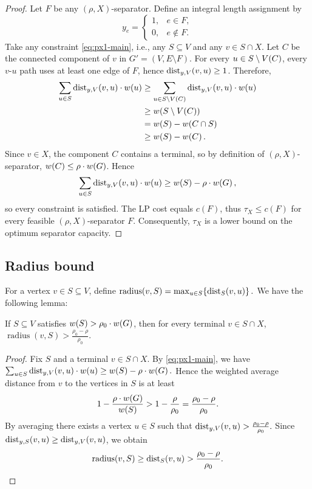 \begin{proof}
Let $F$ be any $(\rho,X)$-separator. Define an integral length assignment by
\[
    y_e=\begin{cases}
        1,& e\in F,\\
        0,& e\notin F.
    \end{cases}
\]
Take any constraint \eqref{eq:px1-main}, i.e., any $S\subseteq V$ and any $v\in S\cap X$.
Let $C$ be the connected component of $v$ in $G'=(V,E\setminus F)$.
For every $u\in S\setminus V\mathopen{}\left( C \right)$, every $v$-$u$ path uses at least one edge of $F$, hence $\text{dist}_{y,V}(v,u)\ge 1$.
Therefore,
\begin{align*}
\sum_{u\in S}\text{dist}_{y,V}(v,u)\cdot w(u)
&\ge \sum_{u\in S\setminus V\mathopen{}\left( C \right)}\text{dist}_{y,V}(v,u)\cdot w(u)\\
&\ge w\mathopen{}\left( S\setminus V\mathopen{}\left( C \right) \right)\\
&= w\mathopen{}\left( S \right)-w\mathopen{}\left( C\cap S \right)\\
&\ge w\mathopen{}\left( S \right)-w\mathopen{}\left( C \right).
\end{align*}
Since $v\in X$, the component $C$ contains a terminal, so by definition of $(\rho,X)$-separator,
$w(C)\le \rho\cdot w\mathopen{}\left( G \right)$. Hence
\[
\sum_{u\in S}\text{dist}_{y,V}(v,u)\cdot w(u)\ge w\mathopen{}\left( S \right)-\rho\cdot w\mathopen{}\left( G \right),
\]
so every constraint is satisfied. The LP cost equals $c(F)$, thus
$\tau_X\le c(F)$ for every feasible $(\rho,X)$-separator $F$. Consequently,
$\tau_X$ is a lower bound on the optimum separator capacity.
\end{proof}

\subsection{Radius bound}

For a vertex $v\in S\subseteq V$, define $
\operatorname{radius}(v,S)=\max_{u\in S}\mathopen{}\left\{ \text{dist}_S(v,u) \right\}.$
We have the following lemma:

\begin{lemma}
If $S\subseteq V$ satisfies $w\mathopen{}\left( S \right)>\rho_0\cdot w\mathopen{}\left( G \right)$, then for every terminal $v\in S\cap X$, $
\operatorname{radius}(v,S)>\frac{\rho_0-\rho}{\rho_0}.
$
\end{lemma}

\begin{proof}
Fix $S$ and a terminal $v\in S\cap X$. By \eqref{eq:px1-main}, we have $
\sum_{u\in S}\text{dist}_{y,V}(v,u)\cdot w(u)\ge w\mathopen{}\left( S \right)-\rho\cdot w\mathopen{}\left( G \right).
$
Hence the weighted average distance from $v$ to the vertices in $S$ is at least
\[
1-\frac{\rho\cdot w\mathopen{}\left( G \right)}{w\mathopen{}\left( S \right)} > 1-\frac{\rho}{\rho_0}=\frac{\rho_0-\rho}{\rho_0}.
\]
By averaging there exists a vertex $u\in S$ such that $
\text{dist}_{y,V}(v,u)>\frac{\rho_0-\rho}{\rho_0}.
$
Since $\text{dist}_{y,S}(v,u)\ge \text{dist}_{y,V}(v,u)$, we obtain
\[
\operatorname{radius}(v,S)\ge \text{dist}_S(v,u)>\frac{\rho_0-\rho}{\rho_0}.
\]
\end{proof}

